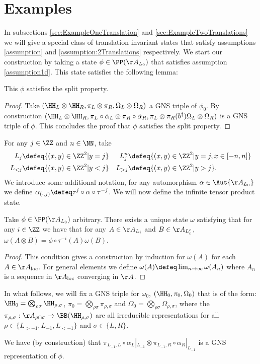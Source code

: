 \section{Examples}\label{sec:examples}
In subsections \ref{sec:ExampleOneTranslation} and \ref{sec:ExampleTwoTranslations} we will give a special class of translation invariant states that satisfy assumptions \ref{assumption} and \ref{assumption:2Translations} respectively. We start our construction by taking a state $\phi\in\PP(\AA_{L_0})$ that satisfies assumption \ref{assumption1d}. This state satisfies the following lemma:
\begin{lemma}\label{lem:phiExampleConsistentWithConjectureSplitProperty}
	This $\phi$ satisfies the split property.
\end{lemma}
\begin{proof}
	Take $(\HH_L\otimes\HH_R,\pi_L\otimes\pi_R,\Omega_L\otimes\Omega_R)$ a GNS triple of $\phi_0$. By construction $(\HH_L\otimes\HH_R,\pi_L\circ\tilde\alpha_L\otimes\pi_R\circ\tilde\alpha_R,\pi_L\otimes\pi_R(b^\dagger)\Omega_L\otimes\Omega_R)$ is a GNS triple of $\phi$. This concludes the proof that $\phi$ satisfies the split property.
\end{proof}
For any $j\in\ZZ$ and $n\in\NN$, take
\begin{align}
	L_j&\defeq \{(x,y)\in\ZZ^2|y=j\}&L_{j}^{n}&\defeq \{(x,y)\in\ZZ^2|y=j,x\in[-n,n]\}\\
	L_{<j}&\defeq \{(x,y)\in\ZZ^2|y<j\}&L_{>j}&\defeq \{(x,y)\in\ZZ^2|y>j\}.
\end{align}
We introduce some additional notation, for any automorphism $\alpha\in\Aut{\AA_{L_0}}$ we define $\alpha_{(\cdot,j)}\defeq \tau^j\circ\alpha\circ\tau^{-j}$. We will now define the infinite tensor product state.
\begin{definition}\label{def:InfiniteTensorProductState}
	Take $\phi\in\PP(\AA_{L_0})$ arbitrary. There exists a unique state $\omega$ satisfying that for any $i\in\ZZ$ we have that for any $A\in\AA_{L_i}$ and $B\in\AA_{L_i^c}$, $\omega(A\otimes B)=\phi\circ\tau^{-i}(A)\omega(B)$.
\end{definition}
\begin{proof}
	This condition gives a construction by induction for $\omega(A)$ for each $A\in\AA_{\text{loc}}$. For general elements we define $\omega(A)\defeq \lim_{n\rightarrow\infty}\omega(A_n)$ where $A_n$ is a sequence in $\AA_{\text{loc}}$ converging in $\AA$.
\end{proof}
In what follows, we will fix a GNS triple for $\omega_0$, $(\HH_0,\pi_0,\Omega_0)$ that is of the form: $\HH_0=\bigotimes_{\rho\sigma}\HH_{\rho,\sigma}$, $\pi_0=\bigotimes_{\rho\sigma}\pi_{\rho,\sigma}$ and $\Omega_0=\bigotimes_{\rho\sigma}\Omega_{\rho,\sigma}$, where the $\pi_{\rho,\sigma}:\AA_{\rho\cap\sigma}\rightarrow\BB(\HH_{\rho,\sigma})$ are all irreducible representations for all $\rho\in \{L_{>-1},L_{-1},L_{<-1}\}$ and $\sigma\in\{L,R\}$.
\begin{remark}\label{rem:GNS_One_Dimensional}
	We have (by construction) that $\pi_{L_{-1},L}\circ\alpha_L|_{L_{-1}}\otimes \pi_{L_{-1},R}\circ\alpha_R|_{L_{-1}}$ is a GNS representation of $\phi$. 
\end{remark}
